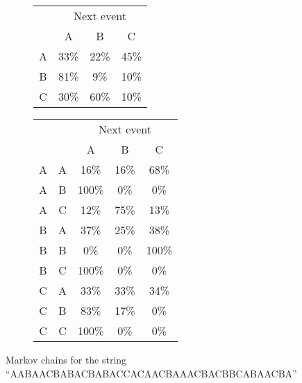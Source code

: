 \documentclass[]{article}
\begin{document}
                \begin{figure}[h]
                    \begin{center}
                        
                        \begin{subfigure}[a]{0.4\textwidth}
                            \begin{tabular}{|c|c|c|c|}
                                \hline
                                & \multicolumn{3}{|c|}{Next event} \\ \cline{2-4}
                                & A & B & C \\ \hline
                                A & 33\% & 22\% & 45\% \\ \hline
                                B & 81\% & 9\% & 10\% \\ \hline
                                C & 30\% & 60\% & 10\% \\ \hline
                            \end{tabular}
                        \end{subfigure}
                        \begin{subfigure}[b]{0.4\textwidth}
                            \begin{tabular}{|c|c|c|c|c|}
                                \hline
                                \multicolumn{2}{|c|}{} & \multicolumn{3}{|c|}{Next event} \\ \cline{3-5}
                                \multicolumn{2}{|c|}{} & A & B & C \\ \hline
                                A & A & 16\% & 16\% & 68\% \\ \hline
                                A & B & 100\% & 0\% & 0\% \\ \hline
                                A & C & 12\% & 75\% & 13\% \\ \hline
                                B & A & 37\% & 25\% & 38\% \\ \hline
                                B & B & 0\% & 0\% & 100\% \\ \hline
                                B & C & 100\% & 0\% & 0\% \\ \hline
                                C & A & 33\% & 33\% & 34\% \\ \hline
                                C & B & 83\% & 17\% & 0\% \\ \hline
                                C & C & 100\% & 0\% & 0\% \\ \hline
                            \end{tabular}
                        \end{subfigure}
                        \caption{Markov chains for the string \\``AABAACBABACBABACCACAACBAAACBACBBCABAACBA''}
                    \end{center}
                \end{figure}
                \newpage
\end{document}
